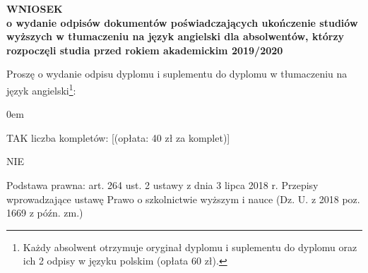 \documentclass{wmiisubmission}
\begin{document}
\cracowdate
{}

\vskip 2cm

\begin{center}
    \large
    \textbf{WNIOSEK\\
    o wydanie odpisów dokumentów poświadczających ukończenie studiów wyższych
    w tłumaczeniu na język angielski dla absolwentów, którzy rozpoczęli studia
    przed rokiem akademickim 2019/2020
    }
\end{center}

\vskip 1cm

Proszę o wydanie odpisu dyplomu i suplementu do dyplomu w tłumaczeniu na język
angielski\footnote{Każdy absolwent otrzymuje oryginał dyplomu i suplementu do
dyplomu oraz ich 2 odpisy w języku polskim (opłata 60 zł).}:

\begin{todolist}
    \itemsep0em
    \item TAK \hfill liczba kompletów:
    \fillField{3cm}[(opłata: 40 zł za komplet)] \hspace{2cm}
    \vskip 1cm
    \item NIE
\end{todolist}

\vskip 1cm
\hspace{\fill} \signature{(podpis osoby wnioskującej)}
\vfill

{
\small
Podstawa prawna:
art. 264 ust. 2 ustawy z dnia 3 lipca 2018 r. Przepisy wprowadzające ustawę
Prawo o szkolnictwie wyższym i nauce (Dz. U. z 2018 poz. 1669 z późn. zm.)
}
\end{document}

